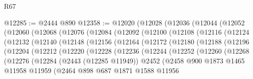\begin{lexlean}{R67}
\begin{coremodule}
@12285 := @2444 @890
@12358 := @12020
    (@12028
      (@12036
        (@12044
          (@12052
            (@12060
              (@12068
                (@12076
                  (@12084
                    (@12092
                      (@12100
                        (@12108
                          (@12116
                            (@12124
                              (@12132
                                (@12140
                                  (@12148
                                    (@12156
                                      (@12164
                                        (@12172
                                          (@12180
                                            (@12188
                                              (@12196
                                                (@12204
                                                  (@12212
                                                    (@12220
                                                      (@12228
                                                        (@12236
                                                          (@12244
                                                            (@12252
                                                              (@12260
                                                                (@12268
                                                                  (@12276
                                                                    (@12284
                                                                      (@2443 (@12285 @11949))
                                                                      @2452
                                                                      (@2458
                                                                        @900
                                                                        @1873
                                                                        @1465
                                                                        @11958
                                                                        @11959
                                                                        (@2464
                                                                          @898
                                                                          @687
                                                                          @1871
                                                                          @1588
                                                                          @11956

\end{coremodule}
\end{lexlean}
